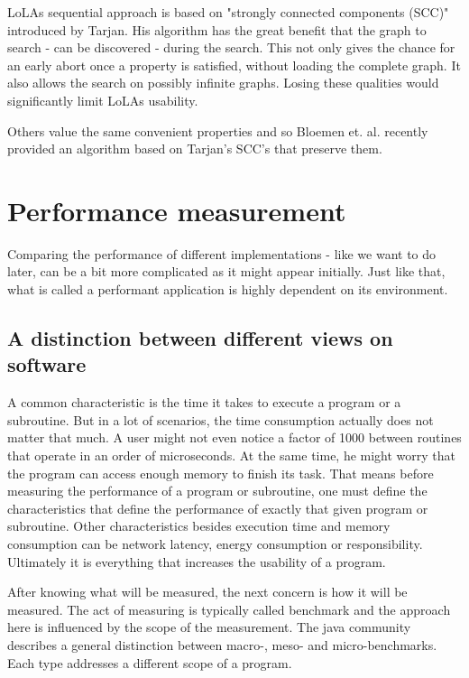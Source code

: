LoLAs sequential approach is based on "strongly connected components (SCC)" introduced by Tarjan\cite{tarjan1972depth}. His algorithm has the great benefit that the graph to search - can be discovered - during the search. This not only gives the chance for an early abort once a property is satisfied, without loading the complete graph. It also allows the search on possibly infinite graphs. Losing these qualities would significantly limit LoLAs usability.

Others value the same convenient properties and so Bloemen et. al. recently provided an algorithm based on Tarjan's SCC's that preserve them\cite{bloemen2016multi}.

\section{Performance measurement}
\label{benchmarking}
Comparing the performance of different implementations - like we want to do later, can be a bit more complicated as it might appear initially. Just like that, what is called a performant application is highly dependent on its environment.

\subsection{A distinction between different views on software}
A common characteristic is the time it takes to execute a program or a subroutine. But in a lot of scenarios, the time consumption actually does not matter that much. A user might not even notice a factor of 1000 between routines that operate in an order of microseconds. At the same time, he might worry that the program can access enough memory to finish its task. That means before measuring the performance of a program or subroutine, one must define the characteristics that define the performance of exactly that given program or subroutine. Other characteristics besides execution time and memory consumption can be network latency, energy consumption or responsibility. Ultimately it is everything that increases the usability of a program.

After knowing what will be measured, the next concern is how it will be measured. The act of measuring is typically called benchmark and the approach here is influenced by the scope of the measurement. The java community describes a general distinction between macro-, meso- and micro-benchmarks\cite{oaks2014java}. Each type addresses a different scope of a program.

